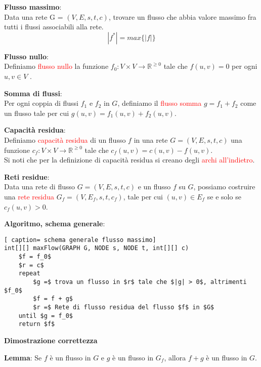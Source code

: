 \documentclass[../cheatSheetAlgoritmi.tex]{subfiles}
\begin{document}
\begin{flushleft}
\textbf{Flusso massimo}:\\
Data una rete G = $(V, E, s, t, c)$, trovare un flusso che abbia valore massimo fra tutti i flussi associabili alla rete.
\begin{equation*}
	|f^{*}| = max\{|f|\}
\end{equation*}
\end{flushleft}
\textbf{Flusso nullo}:\\
Definiamo \textcolor{red}{flusso nullo} la funzione $f_{0} : V \times V \rightarrow \mathbb{R}^{\geq 0}$ tale che $f(u, v) = 0$ per ogni $u, v \in V$ .

\bigskip
\textbf{Somma di flussi}:\\
Per ogni coppia di flussi $f_1$ e $f_2$ in $G$, definiamo il \textcolor{red}{flusso somma} $g = f_1 + f_2$ come un flusso tale per cui $g(u, v) = f_1(u, v) + f_2(u, v)$.

\bigskip
\textbf{Capacità residua}:\\
Definiamo \textcolor{red}{capacità residua} di un flusso $f$ in una rete $G = (V, E, s, t, c)$ una funzione $c_f : V \times V \rightarrow \mathbb{R}^{\geq 0}$ tale che $c_f(u, v) = c(u, v) - f(u, v)$. \\
Si noti che per la definizione di capacità residua si creano degli \textcolor{red}{archi all'indietro}.

\bigskip
\textbf{Reti residue}:\\
Data una rete di flusso $G = (V, E, s, t, c)$ e un flusso $f$ su $G$, possiamo costruire una \textcolor{red}{rete residua} $G_f = (V, E_f, s, t, c_f)$, tale per cui $(u, v) \in E_f$ se e solo se $c_f(u, v) > 0$.

\bigskip
\textbf{Algoritmo, schema generale}:
 \begin{lstlisting}[ caption= schema generale flusso massimo]
int[][] maxFlow(GRAPH G, NODE s, NODE t, int[][] c)
	$f = f_0$
	$r = c$
	repeat 
		$g =$ trova un flusso in $r$ tale che $|g| > 0$, altrimenti $f_0$
		$f = f + g$
		$r =$ Rete di flusso residua del flusso $f$ in $G$
	until $g = f_0$ 
	return $f$
\end{lstlisting}
\textbf{Dimostrazione correttezza}

\bigskip
\textbf{Lemma}: Se $f$ è un flusso in $G$ e $g$ è un flusso in $G_f$, allora $f+g$ è un flusso in $G$.
\end{document}
